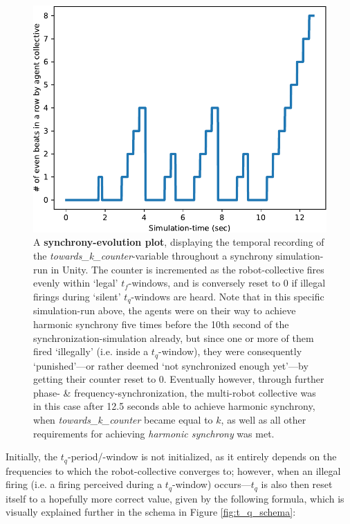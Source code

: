 		\begin{figure}[h]
			\centering
			\includegraphics[width=0.85\linewidth]{Assets/Figures/Illustrations/SynchronyEvolutionPerfMeasureIllustration.pdf}
			\caption[A \textbf{synchrony-evolution plot}.]{A \textbf{synchrony-evolution plot}, displaying the temporal recording of the \textit{towards\_k\_counter}-variable throughout a synchrony simulation-run in Unity. The counter is incremented as the robot-collective fires evenly within `legal' $t_f$-windows, and is conversely reset to 0 if illegal firings during `silent' $t_q$-windows are heard. Note that in this specific simulation-run above, the agents were on their way to achieve harmonic synchrony five times before the 10th second of the synchronization-simulation already, but since one or more of them fired `illegally' (i.e. inside a $t_q$-window), they were consequently `punished'—or rather deemed `not synchronized enough yet'—by getting their counter reset to 0. Eventually however,  through further phase- \& frequency-synchronization, the multi-robot collective was in this case after 12.5 seconds able to achieve harmonic synchrony, when \textit{towards\_k\_counter} became equal to $k$, as well as all other requirements for achieving \textit{harmonic synchrony} was met.}
			\label{fig:synch_evolution_perf_measure_ill}
		\end{figure}

		Initially, the $t_q$-period/-window is not initialized, as it entirely depends on the frequencies to which the robot-collective converges to; however, when an illegal firing (i.e. a firing perceived during a $t_q$-window) occurs—$t_q$ is also then reset itself to a hopefully more correct value, given by the following formula, which is visually explained further in the schema in Figure \ref{fig:t_q_schema}:

